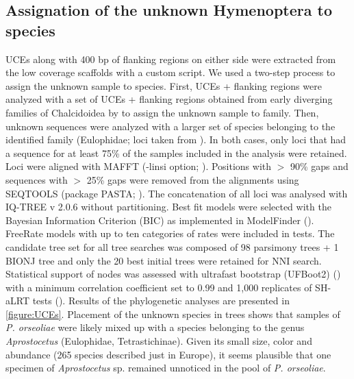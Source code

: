 \subsection{Assignation of the unknown Hymenoptera to species}
\label{sec:SI-2}

UCEs along with 400 bp of flanking regions on either side were extracted from the low coverage scaffolds with a custom script. We used a two-step process to assign the unknown sample to species. First, UCEs + flanking regions were analyzed with a set of UCEs + flanking regions obtained from early diverging families of Chalcidoidea by \citep{cruaud_optimized_2019, rasplus_first_2020} to assign the unknown sample to family. Then, unknown sequences were analyzed with a larger set of species belonging to the identified family (Eulophidae; loci taken from \cite{rasplus_first_2020}). In both cases, only loci that had a sequence for at least 75\% of the samples included in the analysis were retained. Loci were aligned with MAFFT (-linsi option; \citep{katoh_mafft_2013}). Positions with $>$ 90\% gaps and sequences with $>$ 25\% gaps were removed from the alignments using SEQTOOLS (package PASTA; \citep{mirarab_pasta_2015}). The concatenation of all loci was analysed with IQ-TREE v 2.0.6 \citep{minh_iq-tree_2020} without partitioning. Best fit models were selected with the Bayesian Information Criterion (BIC) as implemented in ModelFinder (\citep{kalyaanamoorthy_modelfinder_2017}). FreeRate models with up to ten categories of rates were included in tests. The candidate tree set for all tree searches was composed of 98 parsimony trees + 1 BIONJ tree and only the 20 best initial trees were retained for NNI search. Statistical support of nodes was assessed with ultrafast bootstrap (UFBoot2) (\citep{hoang_ufboot2_2018}) with a minimum correlation coefficient set to 0.99 and 1,000 replicates of SH-aLRT tests (\citep{guindon_new_2010}). Results of the phylogenetic analyses are presented in \figurename{\ref{figure:UCEs}}. Placement of the unknown species in trees shows that samples of \textit{P. orseoliae} were likely mixed up with a species belonging to the genus \textit{Aprostocetus} (Eulophidae, Tetrastichinae). Given its small size, color and abundance (265 species described just in Europe), it seems plausible that one specimen of \textit{Aprostocetus} sp. remained unnoticed in the pool of \textit{P. orseoliae}.




